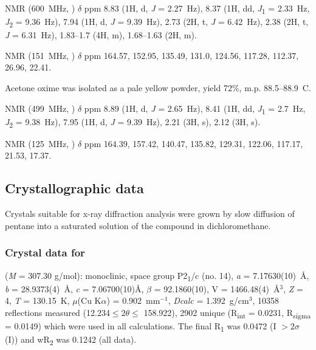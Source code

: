 \begin{refsection}
 NMR (600~MHz, ) $\delta$ ppm 8.83 (1H, d, \textit{J} = 2.27~Hz), 8.37 (1H, dd, \textit{J}\textsubscript{1} = 2.33~Hz, \textit{J}\textsubscript{2} = 9.36~Hz), 7.94 (1H, d, \textit{J} = 9.39~Hz), 2.73 (2H, t, \textit{J} = 6.42~Hz), 2.38 (2H, t, \textit{J} = 6.31~Hz), 1.83--1.7 (4H, m), 1.68--1.63 (2H, m).

 NMR (151~MHz, ) $\delta$ ppm 164.57, 152.95, 135.49, 131.0, 124.56, 117.28, 112.37, 26.96, 22.41.

Acetone oxime  was isolated as a pale yellow powder, yield 72\%, m.p. 88.5--88.9\degree~C.

 NMR (499~MHz, ) $\delta$ ppm 8.89 (1H, d, \textit{J} = 2.65~Hz), 8.41 (1H, dd, \textit{J}\textsubscript{1} = 2.7~Hz, \textit{J}\textsubscript{2} = 9.38~Hz), 7.95 (1H, d, \textit{J} = 9.39~Hz), 2.21 (3H, s), 2.12 (3H, s).

 NMR (125~MHz, ) $\delta$ ppm 164.39, 157.42, 140.47, 135.82, 129.31, 122.06, 117.17, 21.53, 17.37.

\subsection{Crystallographic data}

Crystals suitable for x-ray diffraction analysis were grown by slow diffusion of pentane into a saturated solution of the compound in dichloromethane.

\subsubsection{Crystal data for \texorpdfstring{}{C14H17N3O5}}
 (\emph{M} = 307.30 g/mol): monoclinic, space group P2\textsubscript{1}/c (no. 14), \emph{a} = 7.17630(10)~\AA{}, \emph{b} = 28.9373(4)~\AA{}, \emph{c} = 7.06700(10)\AA{}, $\beta$ = 92.1860(10)\degree{}, V = 1466.48(4)~\AA$^3$, \emph{Z} = 4, \emph{T} = 130.15~K, $\mu$(Cu K$\alpha$) = 0.902~mm$^{-1}$, \emph{Dcalc} = 1.392~g/cm$^3$, 10358 reflections measured (12.234\degree{}$\leq 2\theta \leq$ 158.922\degree{}), 2902 unique (R\textsubscript{int} = 0.0231, R\textsubscript{sigma} = 0.0149) which were used in all calculations. The final R\textsubscript{1} was 0.0472 (I $> 2\sigma$(I)) and wR\textsubscript{2} was 0.1242 (all data).


\end{refsection}
